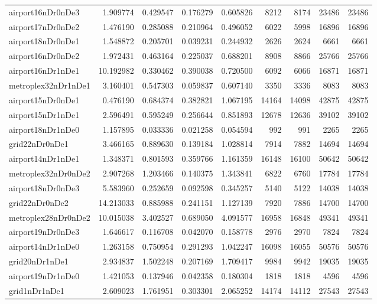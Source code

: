 \begin{longtable}{|l|r|r|r|r|r|r|r|r|}
airport16nDr0nDe3 & 1.909774 & 0.429547 & 0.176279 & 0.605826 & 8212 & 8174 & 23486 & 23486 \\
airport17nDr0nDe2 & 1.476190 & 0.285088 & 0.210964 & 0.496052 & 6022 & 5998 & 16896 & 16896 \\
airport18nDr0nDe1 & 1.548872 & 0.205701 & 0.039231 & 0.244932 & 2626 & 2624 & 6661 & 6661 \\
airport16nDr0nDe2 & 1.972431 & 0.463164 & 0.225037 & 0.688201 & 8908 & 8866 & 25766 & 25766 \\
airport16nDr1nDe1 & 10.192982 & 0.330462 & 0.390038 & 0.720500 & 6092 & 6066 & 16871 & 16871 \\
metroplex32nDr1nDe1 & 3.160401 & 0.547303 & 0.059837 & 0.607140 & 3350 & 3336 & 8083 & 8083 \\
airport15nDr0nDe1 & 0.476190 & 0.684374 & 0.382821 & 1.067195 & 14164 & 14098 & 42875 & 42875 \\
airport15nDr1nDe1 & 2.596491 & 0.595249 & 0.256644 & 0.851893 & 12678 & 12636 & 39102 & 39102 \\
airport18nDr1nDe0 & 1.157895 & 0.033336 & 0.021258 & 0.054594 & 992 & 991 & 2265 & 2265 \\
grid22nDr0nDe1 & 3.466165 & 0.889630 & 0.139184 & 1.028814 & 7914 & 7882 & 14694 & 14694 \\
airport14nDr1nDe1 & 1.348371 & 0.801593 & 0.359766 & 1.161359 & 16148 & 16100 & 50642 & 50642 \\
metroplex32nDr0nDe2 & 2.907268 & 1.203466 & 0.140375 & 1.343841 & 6822 & 6760 & 17784 & 17784 \\
airport18nDr0nDe3 & 5.583960 & 0.252659 & 0.092598 & 0.345257 & 5140 & 5122 & 14038 & 14038 \\
grid22nDr0nDe2 & 14.213033 & 0.885988 & 0.241151 & 1.127139 & 7920 & 7886 & 14700 & 14700 \\
metroplex28nDr0nDe2 & 10.015038 & 3.402527 & 0.689050 & 4.091577 & 16958 & 16848 & 49341 & 49341 \\
airport19nDr0nDe3 & 1.646617 & 0.116708 & 0.042070 & 0.158778 & 2976 & 2970 & 7824 & 7824 \\
airport14nDr1nDe0 & 1.263158 & 0.750954 & 0.291293 & 1.042247 & 16098 & 16055 & 50576 & 50576 \\
grid20nDr1nDe1 & 2.934837 & 1.502248 & 0.207169 & 1.709417 & 9984 & 9942 & 19035 & 19035 \\
airport19nDr1nDe0 & 1.421053 & 0.137946 & 0.042358 & 0.180304 & 1818 & 1818 & 4596 & 4596 \\
grid1nDr1nDe1 & 2.609023 & 1.761951 & 0.303301 & 2.065252 & 14174 & 14112 & 27543 & 27543 \\

\end{longtable}

